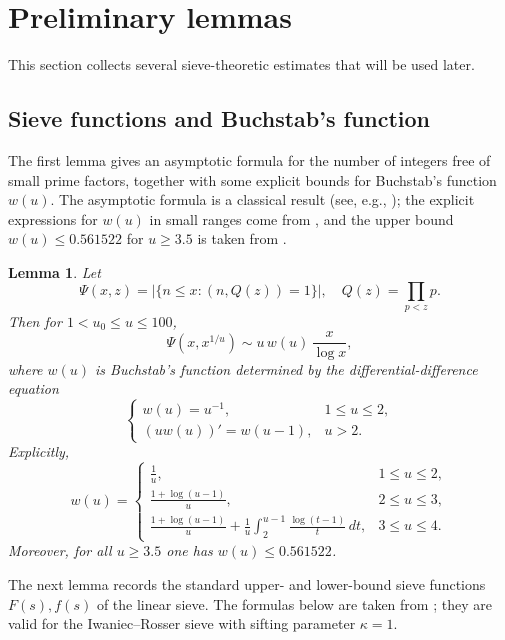 \documentclass[12pt, a4paper]{amsart}
\def\le{\leqslant}
\def\ge{\geqslant}
\theoremstyle{plain}
\newtheorem{lemma}[proposition]{Lemma}
\theoremstyle{remark}
\numberwithin{equation}{section}
\begin{document}
\section{Preliminary lemmas}\label{sec2}
This section collects several sieve-theoretic estimates that will be used later.

\subsection{Sieve functions and Buchstab’s function}
The first lemma gives an asymptotic formula for the number of integers free of small prime factors, 
together with some explicit bounds for Buchstab’s function $w(u)$.  The asymptotic formula is a classical result 
(see, e.g., \cite[Lemma 12.1]{FI10}); the explicit expressions for $w(u)$ in small ranges come from \cite[Lemma 20]{Jia96}, 
and the upper bound $w(u)\le 0.561522$ for $u\ge 3.5$ is taken from \cite[Lemma 2.10]{Wu04}. 

\begin{lemma}\label{w}
Let
\[
\Psi(x,z)=|\{n\le x:(n,Q(z))=1\}|, \quad Q(z)=\prod_{p<z} p .
\]
Then for $1<u_0\le u\le 100$,
\[
\Psi(x,x^{1/u})\sim u\,w(u)\,\frac{x}{\log x},
\]
where $w(u)$ is Buchstab’s function determined by the differential-difference equation
\[
\begin{cases}
w(u)=u^{-1}, & 1\le u\le 2,\\[2mm]
(u w(u))' = w(u-1), & u>2 .
\end{cases}
\]
Explicitly,
\[
w(u)=\begin{cases}
\displaystyle\frac1u, & 1\le u\le 2,\\[4mm]
\displaystyle\frac{1+\log(u-1)}u, & 2\le u\le 3,\\[4mm]
\displaystyle\frac{1+\log(u-1)}u
      +\frac1u\int_{2}^{u-1}\frac{\log(t-1)}t\,dt, & 3\le u\le 4 .
\end{cases}
\]
Moreover, for all $u\ge 3.5$ one has $w(u)\le 0.561522$.
\end{lemma}

The next lemma records the standard upper- and lower-bound sieve functions $F(s),f(s)$ of the linear sieve.  The formulas below are taken from \cite[(3.11) and (3.12)]{HHR81}; they are valid for the Iwaniec--Rosser sieve with sifting parameter $\kappa=1$.
\end{document}
